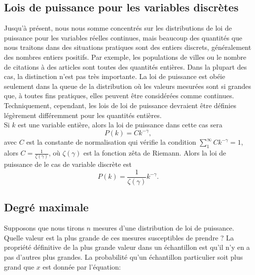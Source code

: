 \subsection{Lois de puissance pour les variables discrètes}
Jusqu'à présent, nous nous somme  concentrés sur les distributions de loi de puissance pour les variables réelles continues, mais beaucoup des quantités que nous traitons dans des situations pratiques sont des entiers discrets, généralement des nombres entiers positifs. Par exemple, les populations de villes ou le nombre de citations à des articles sont toutes des quantités entières. Dans la plupart des cas, la distinction n'est pas très importante. La loi de puissance est obéie seulement dans la queue de la distribution où les valeurs mesurées sont si grandes que, à toutes fins pratiques, elles peuvent être considérées comme continues. Techniquement, cependant, les lois de loi de puissance devraient être définies légèrement différemment pour les quantités entières.\\
Si $k$ est une variable entière, alors la loi de puissance dans cette cas sera
\begin{equation}
P(k)=Ck^{-\gamma},
\end{equation}
avec $C$ est la constante de normalisation qui vérifie la condition $\sum_1^{\infty}Ck^{-\gamma}=1$, alors $C=\frac{1}{\zeta(\gamma)}$, où $\zeta(\gamma)$ est la fonction zêta de Riemann.
Alors la loi de puissance de le cas de variable discrète est
\begin{equation}
P(k)=\frac{1}{\zeta(\gamma)}k^{-\gamma}.
\label{pk-descret}
\end{equation}

\subsection{Degré maximale}
Supposons que nous tirons $n$ mesures d'une distribution de loi de puissance. Quelle valeur est la plus grande de ces mesures susceptibles de prendre ? 
La propriété définitive de la plus grande valeur dans un échantillon est qu'il n'y en a pas d'autres plus grandes. La probabilité qu'un échantillon particulier soit plus grand que $x$ est donnée par l'équation:

